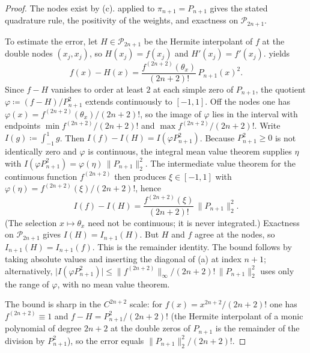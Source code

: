 \documentclass[11pt,a4paper]{article}
\begin{document}
\begin{proof}
The nodes exist by (c).  applied to \(\pi_{n+1}=P_{n+1}\) gives the stated quadrature rule, the positivity of the weights, and exactness on \(\mathcal{P}_{2n+1}\).

To estimate the error, let \(H\in\mathcal{P}_{2n+1}\) be the Hermite interpolant of \(f\) at the double nodes \((x_{j},x_{j})\), so \(H(x_{j})=f(x_{j})\) and \(H'(x_{j})=f'(x_{j})\).  yields
\[
f(x)-H(x)
=
\frac{f^{(2n+2)}(\theta_{x})}{(2n+2)!}\,P_{n+1}(x)^{2}.
\]
Since \(f-H\) vanishes to order at least \(2\) at each simple zero of \(P_{n+1}\), the quotient \(\varphi\coloneqq(f-H)/P_{n+1}^{2}\) extends continuously to \([-1,1]\). Off the nodes one has \(\varphi(x)=f^{(2n+2)}(\theta_{x})/(2n+2)!\), so the image of \(\varphi\) lies in the interval with endpoints \(\min f^{(2n+2)}/(2n+2)!\) and \(\max f^{(2n+2)}/(2n+2)!\). Write \(I(g)\coloneqq\int_{-1}^{1}g\). Then \(I(f)-I(H)=I(\varphi P_{n+1}^{2})\). Because \(P_{n+1}^{2}\ge 0\) is not identically zero and \(\varphi\) is continuous, the integral mean value theorem supplies \(\eta\) with \(I(\varphi P_{n+1}^{2})=\varphi(\eta)\,\|P_{n+1}\|_{2}^{2}\). The intermediate value theorem for the continuous function \(f^{(2n+2)}\) then produces \(\xi\in[-1,1]\) with \(\varphi(\eta)=f^{(2n+2)}(\xi)/(2n+2)!\), hence
\[
I(f)-I(H)
=
\frac{f^{(2n+2)}(\xi)}{(2n+2)!}\,\|P_{n+1}\|_{2}^{2}.
\]
(The selection \(x\mapsto\theta_{x}\) need not be continuous; it is never integrated.) Exactness on \(\mathcal{P}_{2n+1}\) gives \(I(H)=I_{n+1}(H)\). But \(H\) and \(f\) agree at the nodes, so \(I_{n+1}(H)=I_{n+1}(f)\). This is the remainder identity. The bound follows by taking absolute values and inserting the diagonal of (a) at index \(n+1\); alternatively, \(\lvert I(\varphi P_{n+1}^{2})\rvert\le\|f^{(2n+2)}\|_{\infty}/(2n+2)!\,\|P_{n+1}\|_{2}^{2}\) uses only the range of \(\varphi\), with no mean value theorem.

The bound is sharp in the \(C^{2n+2}\) scale: for \(f(x)=x^{2n+2}/(2n+2)!\) one has \(f^{(2n+2)}\equiv 1\) and \(f-H=P_{n+1}^{2}/(2n+2)!\) (the Hermite interpolant of a monic polynomial of degree \(2n+2\) at the double zeros of \(P_{n+1}\) is the remainder of the division by \(P_{n+1}^{2}\)), so the error equals \(\|P_{n+1}\|_{2}^{2}/(2n+2)!\).
\end{proof}
\end{document}
